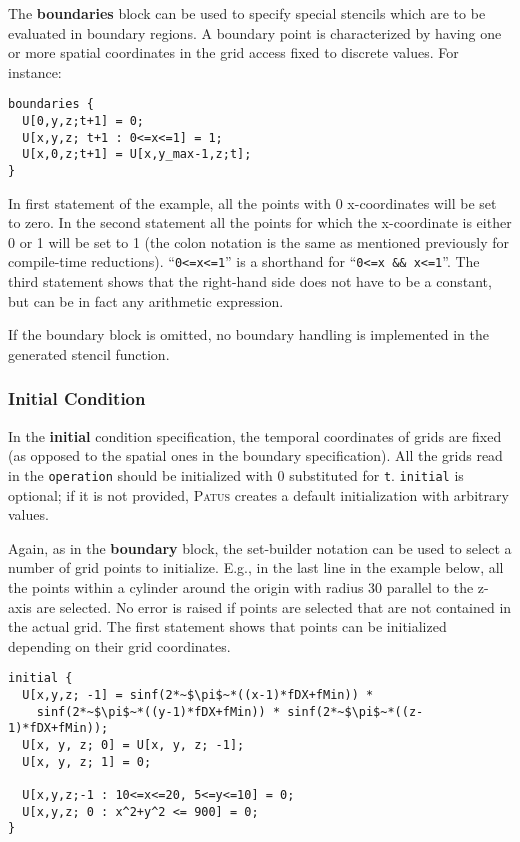 The \textbf{boundaries} block can be used to specify special stencils which are to be evaluated in boundary regions.
A boundary point is characterized by having one or more spatial coordinates in the grid access fixed to discrete values.
For instance:

\begin{lstlisting}[language=stencil]
boundaries {
  U[0,y,z;t+1] = 0;
  U[x,y,z; t+1 : 0<=x<=1] = 1;
  U[x,0,z;t+1] = U[x,y_max-1,z;t];
}
\end{lstlisting}
In first statement of the example, all the points with 0 x-coordinates will be set to zero.
In the second statement all the points for which the x-coordinate is either 0 or 1 will be set to 1 (the colon notation is the
same as mentioned previously for compile-time reductions). ``\texttt{0<=x<=1}'' is a shorthand for ``\texttt{0<=x \&\& x<=1}''.
The third statement shows that the right-hand side does not have to be a constant, but can be in fact any arithmetic expression.

If the boundary block is omitted, no boundary handling is implemented in the generated stencil function.


\subsubsection{Initial Condition}

In the \textbf{initial} condition specification, the temporal coordinates of grids are fixed (as opposed to the spatial ones in the
boundary specification). All the grids read in the \texttt{operation} should be initialized with 0 substituted for \texttt{t}.
\texttt{initial} is optional; if it is not provided, \textsc{Patus} creates a default initialization with arbitrary values.

Again, as in the \textbf{boundary} block, the set-builder notation can be used to select a number of grid points to initialize.
E.g., in the last line in the example below, all the points within a cylinder around the origin with radius 30 parallel to the z-axis
are selected.
No error is raised if points are selected that are not contained in the actual grid.
The first statement shows that points can be initialized depending on their grid coordinates.

\begin{lstlisting}[language=stencil]
initial {
  U[x,y,z; -1] = sinf(2*~$\pi$~*((x-1)*fDX+fMin)) *
    sinf(2*~$\pi$~*((y-1)*fDX+fMin)) * sinf(2*~$\pi$~*((z-1)*fDX+fMin));
  U[x, y, z; 0] = U[x, y, z; -1];
  U[x, y, z; 1] = 0;

  U[x,y,z;-1 : 10<=x<=20, 5<=y<=10] = 0;
  U[x,y,z; 0 : x^2+y^2 <= 900] = 0;
}
\end{lstlisting}


